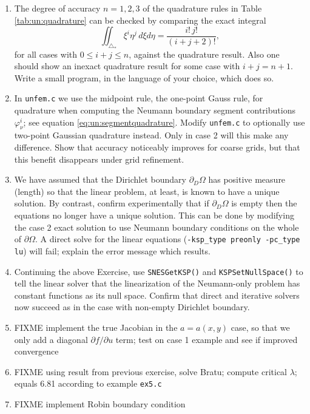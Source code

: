 \begin{enumerate}
\item  \label{exer:un:checkquadrature}  The degree of accuracy $n=1,2,3$ of the quadrature rules in Table \ref{tab:un:quadrature} can be checked by comparing the exact integral
\begin{equation}
\iint_{\triangle_\ast} \xi^i \eta^j\,d\xi d\eta = \frac{i!\,j!}{(i+j+2)!}, \label{eq:un:checkquadrature}
\end{equation}
for all cases with $0\le i+j\le n$, against the quadrature result.  Also one should show an inexact quadrature result for some case with $i+j=n+1$.  Write a small program, in the language of your choice, which does so.
\item \label{exer:un:gaussneumann}  In \texttt{unfem.c} we use the midpoint rule, the one-point Gauss rule, for quadrature when computing the Neumann boundary segment contributions $\varphi_\nu^i$; see equation \eqref{eq:un:segmentquadrature}.  Modify \texttt{unfem.c} to optionally use two-point Gaussian quadrature instead.  Only in case 2 will this make any difference.  Show that accuracy noticeably improves for coarse grids, but that this benefit disappears under grid refinement.
\item \label{exer:un:allneumannfailure}  We have assumed that the Dirichlet boundary $\partial_D \Omega$ has positive measure (length) so that the linear problem, at least, is known to have a unique solution.  By contrast, confirm experimentally that if $\partial_D\Omega$ is empty then the equations no longer have a unique solution.  This can be done by modifying the case 2 exact solution to use Neumann boundary conditions on the whole of $\partial \Omega$.  A direct solve for the linear equations (\texttt{-ksp\_type preonly -pc\_type lu}) will fail; explain the error message which results.
\item \label{exer:un:allneumannresolution}  Continuing the above Exercise, use \texttt{SNESGetKSP()} and \texttt{KSPSetNullSpace()} to tell the linear solver that the linearization of the Neumann-only problem has constant functions as its null space.  Confirm that direct and iterative solvers now succeed as in the case with non-empty Dirichlet boundary.
\item \label{exer:un:truejacobian} FIXME implement the true Jacobian in the $a=a(x,y)$ case, so that we only add a diagonal $\partial f/\partial u$ term; test on case 1 example and see if improved \pSNES convergence
\item \label{exer:un:bratu} FIXME using result from previous exercise, solve Bratu; compute critical $\lambda$; equals 6.81 according to \pSNES example \texttt{ex5.c}
\item \label{exer:un:robin} FIXME implement Robin boundary condition
\end{enumerate}

